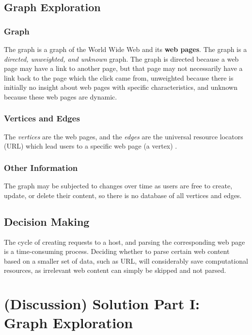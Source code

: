 \documentclass{article}
\begin{document}
\subsection{Graph Exploration}

\subsubsection{Graph}
The graph is a graph of the World Wide Web and its \textbf{web pages}. The graph is a \textit{directed, unweighted, and unknown} graph. The graph is directed because a web page may have a link to another page, but that page may not necessarily have a link back to the page which the click came from, unweighted because there is initially no insight about web pages with specific characteristics, and unknown because these web pages are dynamic.

\subsubsection{Vertices and Edges}
The \textit{vertices} are the web pages, and the \textit{edges} are the universal resource locators (URL) which lead users to a specific web page (a vertex) \cite{bib-02}.

\subsubsection{Other Information}
The graph may be subjected to changes over time as users are free to create, update, or delete their content, so there is no database of all vertices and edges.

\subsection{Decision Making}
The cycle of creating requests to a host, and parsing the corresponding web page is a time-consuming process. Deciding whether to parse certain web content based on a smaller set of data, such as URL, will considerably save computational resources, as irrelevant web content can simply be skipped and not parsed.
\newpage

\section{(Discussion) Solution Part I: Graph Exploration}
\label{sec:3}
\begin{comment}
(Explain why the proposed method is reasonable and how you come to choosing it over other alternatives that you have considered.) \\
\end{comment}
\end{document}
